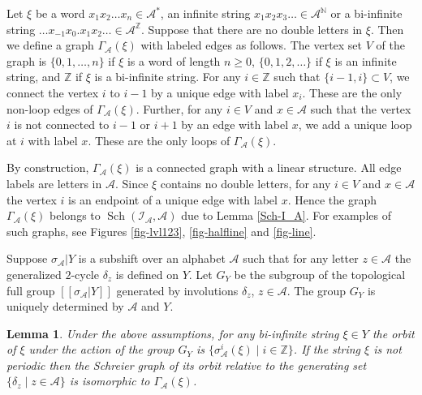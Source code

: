 \documentclass[12pt]{article}
\newtheorem{lemma}[theorem]{Lemma}
\theoremstyle{definition}
\def\bN{\mathbb{N}}
\def\bZ{\mathbb{Z}}
\def\cA{\mathcal{A}}
\def\cI{\mathcal{I}}
\def\de{\delta}
\def\si{\sigma}
\def\Sch{\mathop{\mathrm{Sch}}}
\begin{document}
Let $\xi$ be a word $x_1x_2\ldots x_n\in\cA^*$, an infinite string 
$x_1x_2x_3\ldots\in\cA^{\bN}$ or a bi-infinite string $\ldots 
x_{-1}x_0.x_1x_2\ldots\in\cA^{\bZ}$.  Suppose that there are no double 
letters in $\xi$.  Then we define a graph $\Gamma_{\cA}(\xi)$ with labeled 
edges as follows.  The vertex set $V$ of the graph is $\{0,1,\dots,n\}$ if 
$\xi$ is a word of length $n\ge0$, $\{0,1,2,\dots\}$ if $\xi$ is an 
infinite string, and $\bZ$ if $\xi$ is a bi-infinite string.  For any 
$i\in\bZ$ such that $\{i-1,i\}\subset V$, we connect the vertex $i$ to 
$i-1$ by a unique edge with label $x_i$.  These are the only non-loop edges 
of $\Gamma_{\cA}(\xi)$.  Further, for any $i\in V$ and $x\in\cA$ such that 
the vertex $i$ is not connected to $i-1$ or $i+1$ by an edge with label 
$x$, we add a unique loop at $i$ with label $x$.  These are the only loops 
of $\Gamma_{\cA}(\xi)$.

By construction, $\Gamma_{\cA}(\xi)$ is a connected graph with a linear 
structure.  All edge labels are letters in $\cA$.  Since $\xi$ contains no 
double letters, for any $i\in V$ and $x\in\cA$ the vertex $i$ is an 
endpoint of a unique edge with label $x$.  Hence the graph 
$\Gamma_{\cA}(\xi)$ belongs to $\Sch(\cI_{\cA},\cA)$ due to Lemma 
\ref{Sch-I_A}.  For examples of such graphs, see Figures \ref{fig-lvl123}, 
\ref{fig-halfline} and \ref{fig-line}.

Suppose $\si_{\cA}|Y$ is a subshift over an alphabet $\cA$ such that for 
any letter $z\in\cA$ the generalized $2$-cycle $\de_z$ is defined on $Y$.  
Let $G_Y$ be the subgroup of the topological full group $[[\si_{\cA}|Y]]$ 
generated by involutions $\de_z$, $z\in\cA$.  The group $G_Y$ is uniquely 
determined by $\cA$ and $Y$.

\begin{lemma}\label{Schr-subshift}
Under the above assumptions, for any bi-infinite string $\xi\in Y$ the 
orbit of $\xi$ under the action of the group $G_Y$ is 
$\{\si_{\cA}^i(\xi)\mid i\in\bZ\}$.  If the string $\xi$ is not periodic 
then the Schreier graph of its orbit relative to the generating set 
$\{\de_z\mid z\in\cA\}$ is isomorphic to $\Gamma_{\cA}(\xi)$.
\end{lemma}
\end{document}
